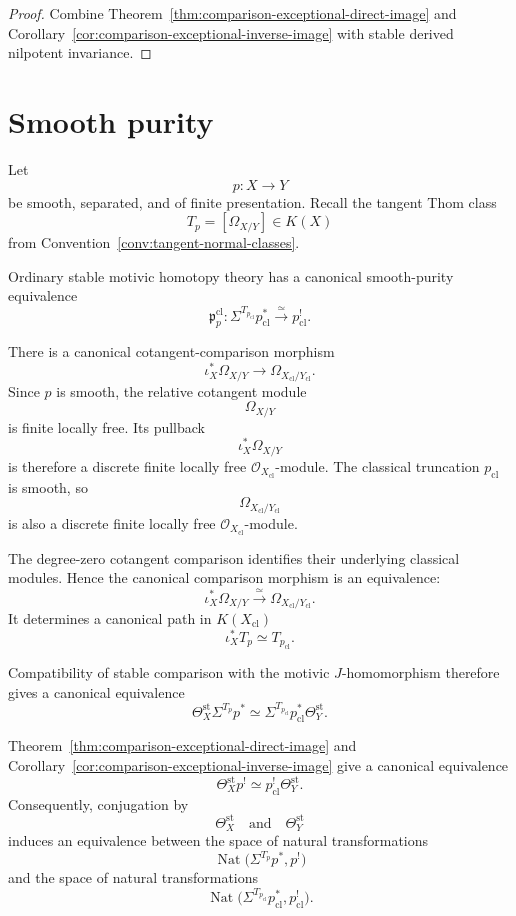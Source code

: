 \begin{proof}
Combine Theorem~\ref{thm:comparison-exceptional-direct-image} and
Corollary~\ref{cor:comparison-exceptional-inverse-image} with stable derived
nilpotent invariance.
\end{proof}


\section{Smooth purity}
\label{sec:six-smooth-purity}

Let
\[
    p:X\longrightarrow Y
\]
be smooth, separated, and of finite presentation.  Recall the tangent Thom
class
\[
    T_p=[\Omega_{X/Y}]\in K(X)
\]
from Convention~\ref{conv:tangent-normal-classes}.

\begin{construction}
\label{constr:smooth-purity-transformation}
Ordinary stable motivic homotopy theory has a canonical smooth-purity
equivalence
\[
    \mathfrak p^{\mathrm{cl}}_p:
    \Sigma^{T_{p_{\mathrm{cl}}}}
    p_{\mathrm{cl}}^*
    \xrightarrow{\simeq}
    p_{\mathrm{cl}}^!.
\]

There is a canonical cotangent-comparison morphism
\[
    \iota_X^*\Omega_{X/Y}
    \longrightarrow
    \Omega_{X_{\mathrm{cl}}/Y_{\mathrm{cl}}}.
\]
Since \(p\) is smooth, the relative cotangent module
\[
    \Omega_{X/Y}
\]
is finite locally free.  Its pullback
\[
    \iota_X^*\Omega_{X/Y}
\]
is therefore a discrete finite locally free
\(\mathcal O_{X_{\mathrm{cl}}}\)-module.  The classical truncation
\(p_{\mathrm{cl}}\) is smooth, so
\[
    \Omega_{X_{\mathrm{cl}}/Y_{\mathrm{cl}}}
\]
is also a discrete finite locally free
\(\mathcal O_{X_{\mathrm{cl}}}\)-module.

The degree-zero cotangent comparison identifies their underlying classical
modules.  Hence the canonical comparison morphism is an equivalence:
\[
    \iota_X^*\Omega_{X/Y}
    \xrightarrow{\simeq}
    \Omega_{X_{\mathrm{cl}}/Y_{\mathrm{cl}}}.
\]
It determines a canonical path in \(K(X_{\mathrm{cl}})\)
\[
    \iota_X^*T_p
    \simeq
    T_{p_{\mathrm{cl}}}.
\]

Compatibility of stable comparison with the motivic
\(J\)-homomorphism therefore gives a canonical equivalence
\[
    \Theta_X^{\mathrm{st}}
    \Sigma^{T_p}p^*
    \simeq
    \Sigma^{T_{p_{\mathrm{cl}}}}
    p_{\mathrm{cl}}^*
    \Theta_Y^{\mathrm{st}}.
\]

Theorem~\ref{thm:comparison-exceptional-direct-image} and
Corollary~\ref{cor:comparison-exceptional-inverse-image}
give a canonical equivalence
\[
    \Theta_X^{\mathrm{st}}p^!
    \simeq
    p_{\mathrm{cl}}^!\Theta_Y^{\mathrm{st}}.
\]
Consequently, conjugation by
\[
    \Theta_X^{\mathrm{st}}
    \quad\text{and}\quad
    \Theta_Y^{\mathrm{st}}
\]
induces an equivalence between the space of natural transformations
\[
    \operatorname{Nat}
    \bigl(
      \Sigma^{T_p}p^*,
      p^!
    \bigr)
\]
and the space of natural transformations
\[
    \operatorname{Nat}
    \bigl(
      \Sigma^{T_{p_{\mathrm{cl}}}}p_{\mathrm{cl}}^*,
      p_{\mathrm{cl}}^!
    \bigr).
\]


\end{construction}
